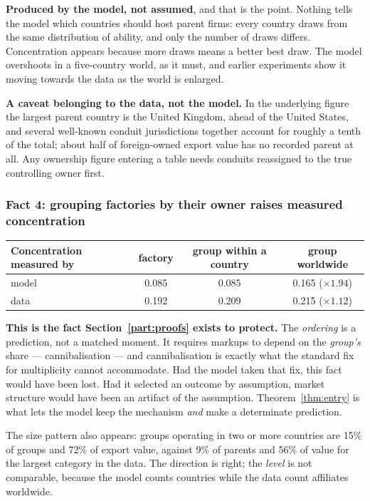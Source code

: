 \documentclass[11pt]{article}
\newenvironment{keypoint}
  {\begin{lrbox}{\kbox}\begin{minipage}{0.93\textwidth}\vspace{3pt}}
  {\vspace{3pt}\end{minipage}\end{lrbox}\begin{center}\fbox{\usebox{\kbox}}\end{center}}
\theoremstyle{plain}
\theoremstyle{remark}
\theoremstyle{definition}
\begin{document}
\textbf{Produced by the model, not assumed}, and that is the point. Nothing tells the
model which countries should host parent firms: every country draws from the same
distribution of ability, and only the number of draws differs. Concentration appears
because more draws means a better best draw. The model overshoots in a five-country
world, as it must, and earlier experiments show it moving towards the data as the world
is enlarged.

\medskip
\noindent\textbf{A caveat belonging to the data, not the model.} In the underlying
figure the largest parent country is the United Kingdom, ahead of the United States,
and several well-known conduit jurisdictions together account for roughly a tenth of the
total; about half of foreign-owned export value has no recorded parent at all. Any
ownership figure entering a table needs conduits reassigned to the true controlling
owner first.

\subsubsection{Fact 4: grouping factories by their owner raises measured concentration}

\begin{center}
\begin{tabular}{lccc}
\toprule
Concentration measured by & factory & group within a country & group worldwide\\
\midrule
model & 0.085 & 0.085 & 0.165 \quad($\times1.94$)\\
data  & 0.192 & 0.209 & 0.215 \quad($\times1.12$)\\
\bottomrule
\end{tabular}
\end{center}

\begin{keypoint}
\textbf{This is the fact Section~\ref{part:proofs} exists to protect.} The \emph{ordering} is a
prediction, not a matched moment. It requires markups to depend on the \emph{group's}
share --- cannibalisation --- and cannibalisation is exactly what the standard fix for
multiplicity cannot accommodate. Had the model taken that fix, this fact would have
been lost. Had it selected an outcome by assumption, market structure would have been
an artifact of the assumption. Theorem~\ref{thm:entry} is what lets the model keep the
mechanism \emph{and} make a determinate prediction.
\end{keypoint}

\noindent The size pattern also appears: groups operating in two or more countries are
15\% of groups and 72\% of export value, against 9\% of parents and 56\% of value for
the largest category in the data. The direction is right; the \emph{level} is not
comparable, because the model counts countries while the data count affiliates
worldwide.
\end{document}

